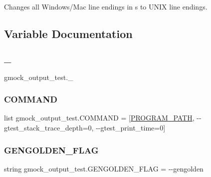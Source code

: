 \begin{DoxyVerb}Changes all Windows/Mac line endings in s to UNIX line endings.\end{DoxyVerb}
 

\subsection{Variable Documentation}
\mbox{\label{namespacegmock__output__test_acd6befb6031f17f78a4425c90b1f5b19}} 
\subsubsection{\texorpdfstring{\_}{\_}}
{\footnotesize\ttfamily gmock\+\_\+output\+\_\+test.\+\_\+\hspace{0.3cm}{\ttfamily [private]}}

\mbox{\label{namespacegmock__output__test_a33f8ca97d99711e23517962ca4c729af}} 
\subsubsection{\texorpdfstring{COMMAND}{COMMAND}}
{\footnotesize\ttfamily list gmock\+\_\+output\+\_\+test.\+C\+O\+M\+M\+A\+ND = \mbox{[}\mbox{\hyperlink{namespacegmock__output__test_a03aac0fac952a0b3648340f529af7f59}{P\+R\+O\+G\+R\+A\+M\+\_\+\+P\+A\+TH}}, \textquotesingle{}-\/-\/gtest\+\_\+stack\+\_\+trace\+\_\+depth=0\textquotesingle{}, \textquotesingle{}-\/-\/gtest\+\_\+print\+\_\+time=0\textquotesingle{}\mbox{]}}

\mbox{\label{namespacegmock__output__test_a0bd3131fe8262154217588fed6b28d45}} 
\subsubsection{\texorpdfstring{GENGOLDEN\_FLAG}{GENGOLDEN\_FLAG}}
{\footnotesize\ttfamily string gmock\+\_\+output\+\_\+test.\+G\+E\+N\+G\+O\+L\+D\+E\+N\+\_\+\+F\+L\+AG = \textquotesingle{}-\/-\/gengolden\textquotesingle{}}

